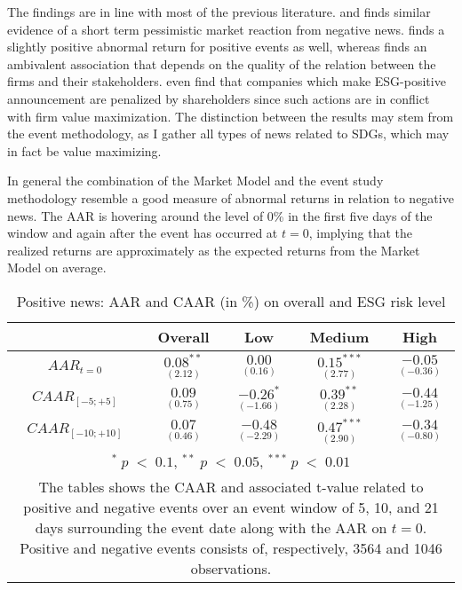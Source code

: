 The findings are in line with most of the previous literature. \cite{Blancard_ESG_sentiment} and \citep{kruger2015corporate} finds similar evidence of a short term pessimistic market reaction from negative news. \citeauthor{Blancard_ESG_sentiment} finds a slightly positive abnormal return for positive events as well, whereas \citeauthor{kruger2015corporate} finds an ambivalent association that depends on the quality of the relation between the firms and their stakeholders. \cite{fisher2011voluntary} even find that companies which make ESG-positive announcement are penalized by shareholders since such actions are in conflict with firm value maximization. The distinction between the results may stem from the event methodology, as I gather all types of news related to SDGs, which may in fact be value maximizing. 

In general the combination of the Market Model and the event study methodology resemble a good measure of abnormal returns in relation to negative news. The AAR is hovering around the level of 0\% in the first five days of the window and again after the event has occurred at $t = 0$, implying that the realized returns are approximately as the expected returns from the Market Model on average.   

\begin{table}[H]
\centering
\caption{Positive news: AAR and CAAR (in \%) on overall and ESG risk level} 
\begin{tabular}{ccccc}
  \hline  \hline
  & \multicolumn{1}{c}{Overall} &  \multicolumn{1}{c}{Low} & \multicolumn{1}{c}{Medium} & \multicolumn{1}{c}{High}\\  
 \hline
$AAR_{t=0}$ &  $\underset{(2.12)}{0.08^{**}}$ & $\underset{(0.16)}{0.00}$ & $\underset{(2.77)}{0.15^{***}}$ &  $\underset{(-0.36)}{-0.05}$ \\ 
$CAAR_{[-5;+5]}$  & $\underset{(0.75)}{0.09}$ &  $\underset{(-1.66)}{-0.26^{*}}$ &  $\underset{(2.28)}{0.39^{**}}$ &  $\underset{(-1.25)}{-0.44}$ \\ 
$CAAR_{[-10;+10]}$    & $\underset{(0.46)}{0.07}$ &  $\underset{(-2.29)}{-0.48}$ &  $\underset{(2.90)}{0.47^{***}}$ &  $\underset{(-0.80)}{-0.34}$ \\ 
    \hline \hline
   \multicolumn{5}{p{10cm}}{ \footnotesize $^* \; p\; <\; 0.1$, $ ^{**} \; p\; <\; 0.05$, $ ^{***} \; p\; <\; 0.01$  } \\
   \multicolumn{5}{p{10cm}}{\footnotesize The tables shows the CAAR and associated t-value related to positive and negative events over an event window of 5, 10, and 21 days surrounding the event date along with the AAR on $t=0$. Positive and negative events consists of, respectively, 3564 and 1046 observations. } \\
   \hline
\end{tabular}
\label{tab: ST_pos_significance}
\end{table}

